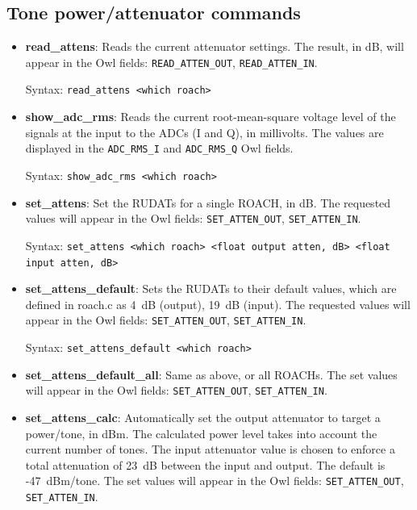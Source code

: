 \subsection{Tone power/attenuator commands}
\begin{itemize}[leftmargin=*,label={}]

\item \textbf{read\_attens}: Reads the current attenuator settings. The result, in dB, will appear in the Owl fields: \texttt{READ\_ATTEN\_OUT}, \texttt{READ\_ATTEN\_IN}.

Syntax: \texttt{read\_attens <which roach>}

\item \textbf{show\_adc\_rms}: Reads the current root-mean-square voltage level of the signals at the input to the ADCs (I and Q), in millivolts. The values are displayed in the \texttt{ADC\_RMS\_I} and \texttt{ADC\_RMS\_Q} Owl fields.

Syntax: \texttt{show\_adc\_rms <which roach>}

\item \textbf{set\_attens}: Set the RUDATs for a single ROACH, in dB. The requested values will appear in the Owl fields: \texttt{SET\_ATTEN\_OUT}, \texttt{SET\_ATTEN\_IN}.

Syntax: \texttt{set\_attens <which roach> <float output atten, dB> <float input atten, dB>}

\item \textbf{set\_attens\_default}: Sets the RUDATs to their default values, which are defined in roach.c as 4~dB (output), 19~dB (input). The requested values will appear in the Owl fields: \texttt{SET\_ATTEN\_OUT}, \texttt{SET\_ATTEN\_IN}.

Syntax: \texttt{set\_attens\_default <which roach>}

\item \textbf{set\_attens\_default\_all}: Same as above, or all ROACHs. The set values will appear in the Owl fields: \texttt{SET\_ATTEN\_OUT}, \texttt{SET\_ATTEN\_IN}.

\item \textbf{set\_attens\_calc}: Automatically set the output attenuator to target a power/tone, in dBm. The calculated power level takes into account the current number of tones. The input attenuator value is chosen to enforce a total attenuation of 23~dB between the input and output. The default is -47~dBm/tone. The set values will appear in the Owl fields: \texttt{SET\_ATTEN\_OUT}, \texttt{SET\_ATTEN\_IN}.


\end{itemize}
